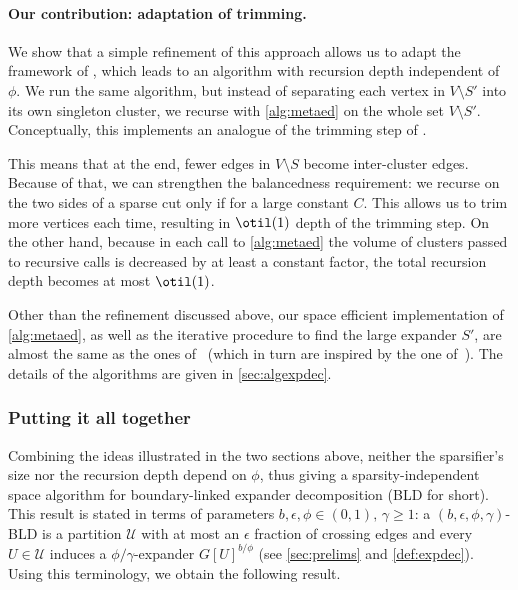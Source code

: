 \paragraph{Our contribution: adaptation of trimming.} We show that a simple refinement of this approach allows us to adapt the framework of \cite{offlineexpdec}, which leads to an algorithm with recursion depth independent of  $\phi$. We run the same algorithm, but instead of separating each vertex in $V \setminus S'$ into its own singleton cluster, we recurse with \cref{alg:metaed} on the whole set $V \setminus S'$. Conceptually, this implements an analogue of the trimming step of \cite{offlineexpdec}.

This means that at the end, fewer edges in $V \setminus S$ become inter-cluster edges. Because of that,
we can strengthen the balancedness requirement: we recurse on the two sides of a sparse cut only if  for a large constant $C$. This allows us to trim more vertices each time, resulting in $\otil(1)$ depth of the trimming step.  On the other hand, because in each call to \cref{alg:metaed} the volume of clusters passed to recursive calls is decreased by at least a constant factor, the total recursion depth becomes at most $\otil(1)$.

Other than the refinement discussed above, our space efficient implementation of \cref{alg:metaed}, as well as  the iterative procedure to find the large expander $S'$, are almost the same as the ones of~\cite{streamexpdec} (which in turn are  inspired by the one of~\cite{triang}). The details of the algorithms are given in \cref{sec:algexpdec}.

\subsubsection*{Putting it all together}
Combining the ideas illustrated in the two sections above, neither the sparsifier's size nor the recursion depth depend on $\phi$, thus giving a sparsity-independent space algorithm for boundary-linked expander decomposition  (BLD for short). This result is stated in terms of parameters $b,\epsilon,\phi \in (0,1), \, \gamma \ge 1$: a $(b, \epsilon, \phi, \gamma)$-BLD is a partition $\mathcal{U}$ with  at most an $\epsilon$ fraction of crossing edges and every $U \in \mathcal{U}$ induces a $\phi/\gamma$-expander $G[U]^{b/\phi}$ (see \cref{sec:prelims} and \cref{def:expdec}). Using this terminology, we obtain the following result.


